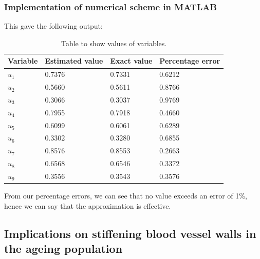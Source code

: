 \documentclass[11pt]{article}
\numberwithin{equation}{section}
\begin{document}
\subsubsection{Implementation of numerical scheme in MATLAB}

This gave the following output:
\begin{table}[H]
    \centering
    \begin{tabular}{llll}
        \toprule
        \textbf{Variable} & \textbf{Estimated value} & \textbf{Exact value} & \textbf{Percentage error}\\
        \midrule
        $u_1$ & 0.7376 & 0.7331 & 0.6212 \\
        $u_2$ & 0.5660 & 0.5611 & 0.8766 \\
        $u_3$ & 0.3066 & 0.3037 & 0.9769 \\
        $u_4$ & 0.7955 & 0.7918 & 0.4660 \\
        $u_5$ & 0.6099 & 0.6061 & 0.6289 \\
        $u_6$ & 0.3302 & 0.3280 & 0.6855 \\
        $u_7$ & 0.8576 & 0.8553 & 0.2663 \\
        $u_8$ & 0.6568 & 0.6546 & 0.3372 \\
        $u_9$ & 0.3556 & 0.3543 & 0.3576 \\ 
        \bottomrule
    \end{tabular}
    \caption{Table to show values of variables.}
\end{table}
From our percentage errors, we can see that no value exceeds an error of 1\%, hence we can say that the approximation is effective.
\subsection{Implications on stiffening blood vessel walls in the ageing population}
\end{document}
